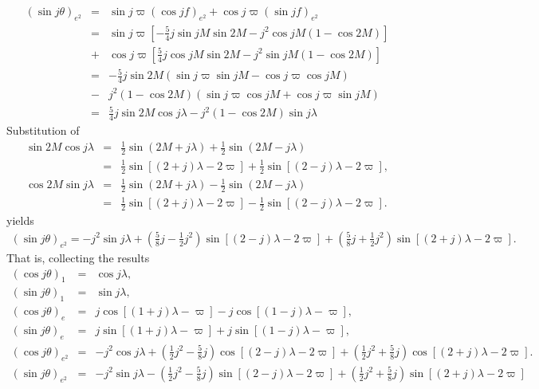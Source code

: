 \documentclass [12pt, a4paper] {article}
\begin{document}
\begin {eqnarray}
    (\sin j\theta)_{e^2}
    &=&
    \sin j\varpi(\cos jf)_{e^2} + \cos j\varpi(\sin jf)_{e^2}
    \\
    &=&
    \sin j\varpi
    \left[
        -\frac{5}{4}j\sin jM\sin 2M - j^2\cos jM(1 - \cos 2M)
    \right] 
    \\
    &+& \cos j\varpi
    \left[
        \frac{5}{4}j\cos jM\sin 2M 
        -
        j^2\sin jM 
        \left(
            1 - \cos 2M
        \right)
    \right]
    \\
    &=&
    -\frac{5}{4}j\sin 2M
    \left(
        \sin j\varpi\sin jM
        - 
        \cos j\varpi\cos jM
    \right)
    \\\nonumber
    &-& j^2(1 - \cos 2M)
    \left(
        \sin j\varpi\cos jM
        + 
        \cos j\varpi\sin jM
    \right)
    \\
    &=& 
    \frac{5}{4}j \sin 2M\cos j\lambda 
    - 
    j^2(1 - \cos 2M)
    \sin j\lambda
\end {eqnarray}
Substitution of 
\begin {eqnarray}
    \sin 2M\cos j\lambda 
    &=& 
    \frac{1}{2}\sin(2M + j\lambda) 
    +
    \frac{1}{2}\sin(2M - j\lambda)
    \\
    &=& 
    \frac{1}{2}\sin[(2 + j)\lambda - 2\varpi] 
    +
    \frac{1}{2}\sin[(2 - j)\lambda - 2\varpi],
    \\
    \cos 2M\sin j\lambda 
    &=& 
    \frac{1}{2}\sin(2M + j\lambda) 
    -
    \frac{1}{2}\sin(2M - j\lambda)
    \\
    &=& 
    \frac{1}{2}\sin[(2 + j)\lambda - 2\varpi] 
    - 
    \frac{1}{2}\sin[(2 - j)\lambda - 2\varpi].
\end {eqnarray}
yields 
\begin {eqnarray}
    (\sin j\theta)_{e^2}
    =
    -j^2\sin j\lambda
    + 
    \left(
        \frac{5}{8}j
        -
        \frac{1}{2}j^2
    \right)\sin[(2 - j)\lambda - 2\varpi]
    +
    \left(
        \frac{5}{8}j
        +
        \frac{1}{2}j^2
    \right)\sin[(2 + j)\lambda - 2\varpi].
\end {eqnarray}
That is, collecting the results 
\begin {eqnarray}
    (\cos j\theta)_{1} &=& \cos j\lambda,
    \\
    (\sin j\theta)_{1} &=& \sin j\lambda,
    \\
    (\cos j\theta)_{e} &=&
    j\cos[(1+j)\lambda - \varpi] - j\cos[(1-j)\lambda - \varpi],
    \\
    (\sin j\theta)_{e} &=&
    j\sin[(1 + j)\lambda - \varpi] + j\sin[(1 - j)\lambda - \varpi],
    \\
    (\cos j\theta)_{e^2}
    &=&
    -
    j^2\cos j\lambda
    +
    \left(
        \frac{1}{2}j^2 - \frac{5}{8}j
    \right)
    \cos[(2 - j)\lambda - 2\varpi]
    +
    \left(
        \frac{1}{2}j^2 + \frac{5}{8}j
    \right)
    \cos[(2 + j)\lambda - 2\varpi].
    \\
    (\sin j\theta)_{e^2}
    &=&
    -j^2\sin j\lambda
    -
    \left(
        \frac{1}{2}j^2
        -
        \frac{5}{8}j
    \right)\sin[(2 - j)\lambda - 2\varpi]
    +
    \left(
        \frac{1}{2}j^2
        +
        \frac{5}{8}j
    \right)\sin[(2 + j)\lambda - 2\varpi]\quad\quad
\end {eqnarray}
\end{document}
